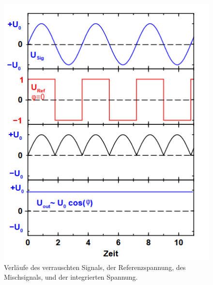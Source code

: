 \begin{figure}[H]
  \centering
  \includegraphics{bsp.png}
  \caption{Verläufe des verrauschten Signals, der Referenzspannung, des Mischsignals, und der integrierten Spannung.  \cite[S. 2]{l}}
\end{figure}
